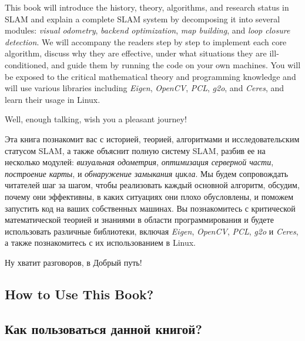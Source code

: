 \begin{English}
    This book will introduce the history, theory, algorithms, and research status in SLAM and explain a complete SLAM system by decomposing it into several modules: \textit{visual odometry}, \textit{backend optimization}, \textit{map building}, and \textit{loop closure detection}. We will accompany the readers step by step to implement each core algorithm, discuss why they are effective, under what situations they are ill-conditioned, and guide them by running the code on your own machines. You will be exposed to the critical mathematical theory and programming knowledge and will use various libraries including \textit{Eigen}, \textit{OpenCV}, \textit{PCL}, \textit{g2o}, and \textit{Ceres}, and learn their usage in Linux.
    
    Well, enough talking, wish you a pleasant journey!
\end{English}

\begin{Russian}
    Эта книга познакомит вас с историей, теорией, алгоритмами и исследовательским статусом SLAM, а также объяснит полную систему SLAM, разбив ее на несколько модулей: \textit{визуальная одометрия}, \textit{оптимизация серверной части}, \textit{построение карты}, и \textit{обнаружение замыкания цикла}. Мы будем сопровождать читателей шаг за шагом, чтобы реализовать каждый основной алгоритм, обсудим, почему они эффективны, в каких ситуациях они плохо обусловлены, и поможем запустить код на ваших собственных машинах. Вы познакомитесь с критической математической теорией и знаниями в области программирования и будете использовать различные библиотеки, включая \textit{Eigen}, \textit{OpenCV}, \textit{PCL}, \textit{g2o} и \textit{Ceres}, а также познакомитесь с их использованием в Linux.
    
    Ну хватит разговоров, в Добрый путь!
\end{Russian}


\begin{English}
    \section*{How to Use This Book?}    
\end{English}

\begin{Russian}
    \section*{Как пользоваться данной книгой?}
\end{Russian}

